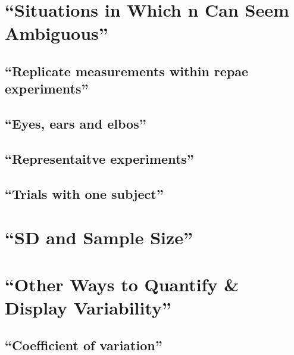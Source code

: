 \documentclass[]{book}
\theoremstyle{definition}
\theoremstyle{definition}
\theoremstyle{definition}
\theoremstyle{remark}
\begin{document}
\section{\texorpdfstring{``Situations in Which n Can Seem
Ambiguous''}{Situations in Which n Can Seem Ambiguous}}\label{situations-in-which-n-can-seem-ambiguous}

\subsection{\texorpdfstring{``Replicate measurements within repae
experiments''}{Replicate measurements within repae experiments}}\label{replicate-measurements-within-repae-experiments}

\subsection{\texorpdfstring{``Eyes, ears and
elbos''}{Eyes, ears and elbos}}\label{eyes-ears-and-elbos}

\subsection{\texorpdfstring{``Representaitve
experiments''}{Representaitve experiments}}\label{representaitve-experiments}

\subsection{\texorpdfstring{``Trials with one
subject''}{Trials with one subject}}\label{trials-with-one-subject}

\section{\texorpdfstring{``SD and Sample
Size''}{SD and Sample Size}}\label{sd-and-sample-size}

\section{\texorpdfstring{``Other Ways to Quantify \& Display
Variability''}{Other Ways to Quantify \& Display Variability}}\label{other-ways-to-quantify-display-variability}

\subsection{\texorpdfstring{``Coefficient of
variation''}{Coefficient of variation}}\label{coefficient-of-variation}
\end{document}
